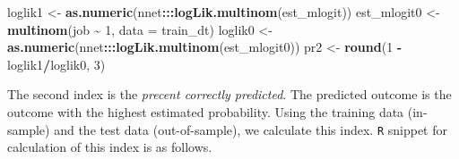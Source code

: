 \documentclass[
  12pt,
]{article}
\newenvironment{Shaded}{\begin{snugshade}}{\end{snugshade}}
\newcommand{\CommentTok}[1]{\textcolor[rgb]{0.56,0.35,0.01}{\textit{#1}}}
\newcommand{\DataTypeTok}[1]{\textcolor[rgb]{0.13,0.29,0.53}{#1}}
\newcommand{\DecValTok}[1]{\textcolor[rgb]{0.00,0.00,0.81}{#1}}
\newcommand{\KeywordTok}[1]{\textcolor[rgb]{0.13,0.29,0.53}{\textbf{#1}}}
\newcommand{\NormalTok}[1]{#1}
\newcommand{\OperatorTok}[1]{\textcolor[rgb]{0.81,0.36,0.00}{\textbf{#1}}}
\newcommand{\StringTok}[1]{\textcolor[rgb]{0.31,0.60,0.02}{#1}}
\begin{document}
\begin{Shaded}
\begin{Highlighting}[]
\NormalTok{loglik1 \textless{}{-}}\StringTok{ }\KeywordTok{as.numeric}\NormalTok{(nnet}\OperatorTok{:::}\KeywordTok{logLik.multinom}\NormalTok{(est\_mlogit))}
\NormalTok{est\_mlogit0 \textless{}{-}}\StringTok{ }\KeywordTok{multinom}\NormalTok{(job }\OperatorTok{\textasciitilde{}}\StringTok{ }\DecValTok{1}\NormalTok{, }\DataTypeTok{data =}\NormalTok{ train\_dt)}
\NormalTok{loglik0 \textless{}{-}}\StringTok{ }\KeywordTok{as.numeric}\NormalTok{(nnet}\OperatorTok{:::}\KeywordTok{logLik.multinom}\NormalTok{(est\_mlogit0))}
\NormalTok{pr2 \textless{}{-}}\StringTok{ }\KeywordTok{round}\NormalTok{(}\DecValTok{1} \OperatorTok{{-}}\StringTok{ }\NormalTok{loglik1}\OperatorTok{/}\NormalTok{loglik0, }\DecValTok{3}\NormalTok{)}
\end{Highlighting}
\end{Shaded}

The second index is the \emph{precent correctly predicted}. The
predicted outcome is the outcome with the highest estimated probability.
Using the training data (in-sample) and the test data (out-of-sample),
we calculate this index. \texttt{R} snippet for calculation of this
index is as follows.

\begin{Shaded}
\end{Shaded}
\end{document}
